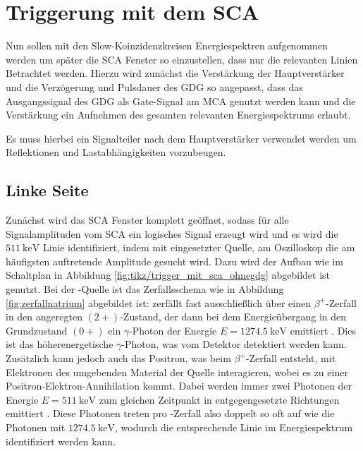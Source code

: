 \section{Triggerung mit dem SCA}
Nun sollen mit den Slow-Koinzidenzkreisen Energiespektren aufgenommen werden um später die SCA Fenster so einzustellen, dass nur die relevanten Linien Betrachtet werden. Hierzu wird zunächst die Verstärkung der Hauptverstärker und die Verzögerung und Pulsdauer des GDG so angepasst, dass das Ausgangssignal des GDG als Gate-Signal am MCA genutzt werden kann und die Verstärkung ein Aufnehmen des gesamten relevanten Energiespektrums erlaubt.

Es muss hierbei ein Signalteiler nach dem Hauptverstärker verwendet werden um Reflektionen und Lastabhängigkeiten vorzubeugen.

\subsection*{Linke Seite}
Zunächst wird das SCA Fenster komplett geöffnet, sodass für alle Signalamplituden vom SCA ein logisches Signal erzeugt wird und es wird die $\SI{511}{\kilo\eV}$ Linie identifiziert, indem mit eingesetzter \na Quelle, am Oszilloskop die am häufigsten auftretende Amplitude gesucht wird. Dazu wird der Aufbau wie im Schaltplan in Abbildung \ref{fig:tikz/trigger_mit_sca_ohnegdg} abgebildet ist genutzt. Bei der \na-Quelle ist das Zerfallsschema wie in Abbildung \ref{fig:zerfallnatrium} abgebildet ist: \na zerfällt fast ausschließlich über einen $\beta^+$-Zerfall in den angeregten \neon $(2+)$-Zustand, der dann bei dem Energieübergang in den Grundzustand $(0+)$ ein $\gamma$-Photon der Energie $E=\SI{1274.5}{\kilo\eV}$ emittiert \cite[9]{525va}. Dies ist das höherenergetische $\gamma$-Photon, was vom Detektor detektiert werden kann. Zusätzlich kann jedoch auch das Positron, was beim $\beta^+$-Zerfall entsteht, mit Elektronen des umgebenden Material der Quelle interagieren, wobei es zu einer Positron-Elektron-Annihilation kommt. Dabei werden immer zwei Photonen der Energie $E=\SI{511}{\kilo\eV}$ zum gleichen Zeitpunkt in entgegengesetzte Richtungen emittiert \cite[7]{leotechniques}. Diese Photonen treten pro \na-Zerfall also doppelt so oft auf wie die Photonen mit $\SI{1274.5}{\kilo\eV}$, wodurch die entsprechende Linie im Energiespektrum identifiziert werden kann.



